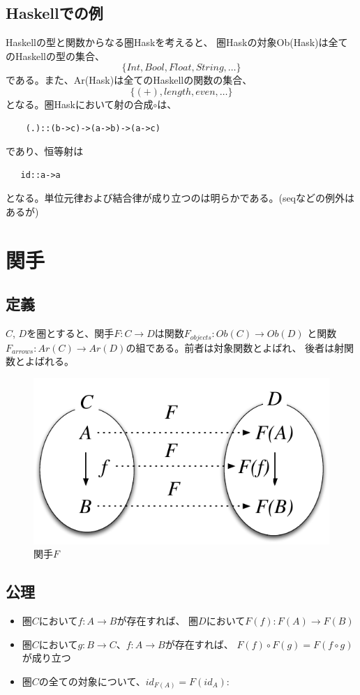 \documentclass{jsarticle}
\begin{document}
\subsection{Haskellでの例}
Haskellの型と関数からなる圏Haskを考えると、
圏Haskの対象Ob(Hask)は全てのHaskellの型の集合、
\[\{Int, Bool, Float, String, \ldots\}\]
である。また、Ar(Hask)は全てのHaskellの関数の集合、
\[\{(+), length, even, \ldots\}\]
となる。圏Haskにおいて射の合成$\circ$は、
\begin{lstlisting}
    (.)::(b->c)->(a->b)->(a->c)
\end{lstlisting}
であり、恒等射は
\begin{lstlisting}
   id::a->a
\end{lstlisting}
となる。単位元律および結合律が成り立つのは明らかである。(seqなどの例外はあるが)

\newpage
\section{関手}

\subsection{定義}
$C$, $D$を圏とすると、関手$F:C \to D$は関数$F_{objects}:Ob(C) \to Ob(D)$
と関数$F_{arrows}:Ar(C)\to Ar(D)$の組である。前者は対象関数とよばれ、
後者は射関数とよばれる。

\begin{figure}[htbp]
    \centering
    \includegraphics{diag_functor.pdf}
    \caption{関手$F$}
\end{figure}

\subsection{公理}
\begin{itemize}
    \item 圏$C$において$f:A\to B$が存在すれば、
        圏$D$において$F(f):F(A)\to F(B)$
    \item 圏$C$において$g:B\to C$、$f:A\to B$が存在すれば、
        $F(f)\circ F(g)=F(f\circ g)$が成り立つ
    \item 圏$C$の全ての対象について、$id_{F(A)}=F(id_A)$:
\end{itemize}
\end{document}
